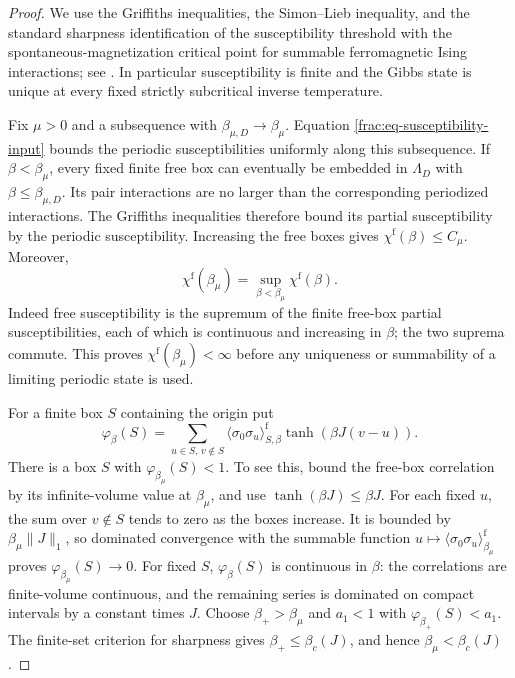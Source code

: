 \documentclass[11pt]{article}
\begin{document}
\begin{proof}
We use the Griffiths inequalities, the Simon--Lieb inequality, and
the standard sharpness identification of the susceptibility
threshold with the spontaneous-magnetization critical point for
summable ferromagnetic Ising interactions; see \cite{DCT}.
In particular susceptibility is finite and the Gibbs state is
unique at every fixed strictly subcritical inverse temperature.

Fix \(\mu>0\) and a subsequence with
\(\beta_{\mu,D}\to\beta_\mu\). Equation
\eqref{frac:eq-susceptibility-input} bounds the periodic
susceptibilities uniformly along this subsequence. If
\(\beta<\beta_\mu\), every fixed finite free box can eventually
be embedded in \(\Lambda_D\) with
\(\beta\le\beta_{\mu,D}\). Its pair interactions are no larger
than the corresponding periodized interactions. The Griffiths
inequalities therefore bound its partial susceptibility by the
periodic susceptibility. Increasing the free boxes gives
\(\chi^{\mathrm f}(\beta)\le C_\mu\). Moreover,
\begin{equation}\label{frac:eq-free-left-continuity}
 \chi^{\mathrm f}(\beta_\mu)
   =\sup_{\beta<\beta_\mu}\chi^{\mathrm f}(\beta).
\end{equation}
Indeed free susceptibility is the supremum of the finite free-box
partial susceptibilities, each of which is continuous and
increasing in \(\beta\); the two suprema commute. This proves
\(\chi^{\mathrm f}(\beta_\mu)<\infty\) before any uniqueness
or summability of a limiting periodic state is used.

For a finite box \(S\) containing the origin put
\[
 \varphi_\beta(S)=\sum_{u\in S,\,v\notin S}
 \langle\sigma_0\sigma_u\rangle^{\mathrm f}_{S,\beta}
                  \tanh(\beta J(v-u)).
\]
There is a box \(S\) with \(\varphi_{\beta_\mu}(S)<1\).
To see this, bound the free-box correlation by its infinite-volume
value at \(\beta_\mu\), and use
\(\tanh(\beta J)\le\beta J\). For each fixed \(u\), the
sum over \(v\notin S\) tends to zero as the boxes increase.
It is bounded by \(\beta_\mu\|J\|_1\), so dominated convergence
with the summable function
\(u\mapsto\langle\sigma_0\sigma_u\rangle^{\mathrm f}_{\beta_\mu}\)
proves \(\varphi_{\beta_\mu}(S)\to0\).
For fixed \(S\), \(\varphi_\beta(S)\) is continuous in
\(\beta\): the correlations are finite-volume continuous, and
the remaining series is dominated on compact intervals by a
constant times \(J\). Choose
\(\beta_+>\beta_\mu\) and \(a_1<1\) with
\(\varphi_{\beta_+}(S)<a_1\). The finite-set criterion for
sharpness gives \(\beta_+\le\beta_c(J)\), and hence
\(\beta_\mu<\beta_c(J)\).


\end{proof}
\end{document}
